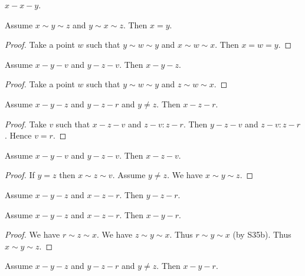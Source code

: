 \documentclass{article}
\newcommand{\Betw}[3]{#1 {\sim} #2 {\sim} #3}
\begin{document}
  \begin{forthel}
    \begin{lemma}[L3o3]
      $x-x-y$.
    \end{lemma}

    \begin{lemma} %
      Assume $\Betw{x}{y}{z}$ and $\Betw{y}{x}{z}$.
      Then $x = y$.
    \end{lemma}
    \begin{proof}
      Take a point $w$ such that
      $\Betw{y}{w}{y}$ and $\Betw{x}{w}{x}$.
      Then $x = w = y$.
    \end{proof}

    \begin{lemma} %
      Assume $x-y-v$ and $y-z-v$. Then $x-y-z$.
    \end{lemma}
    \begin{proof}
      Take a point $w$ such that
      $\Betw{y}{w}{y}$ and $\Betw{z}{w}{x}$.
    \end{proof}

    \begin{lemma}[L3o7a]
      Assume $x-y-z$ and $y-z-r$ and $y \neq z$. Then $x-z-r$.
    \end{lemma}
    \begin{proof}
    	Take $v$ such that $x-z-v$ and $z-v : z-r$.	Then $y-z-v$ and $z-v : z-r$. Hence $v = r$.
    \end{proof}

    \begin{lemma}[S35b] %
      Assume $x-y-v$ and $y-z-v$. Then $x-z-v$.
    \end{lemma}
    \begin{proof}
      If $y = z$ then $\Betw{x}{z}{v}$.
      Assume $y \neq z$.
      We have $\Betw{x}{y}{z}$.
    \end{proof}

    \begin{lemma}[L3o6a]
      Assume $x-y-z$ and $x-z-r$. Then $y-z-r$.
    \end{lemma}

    \begin{lemma} %
      Assume $x-y-z$ and $x-z-r$. Then $x-y-r$.
    \end{lemma}
    \begin{proof}
      We have $\Betw{r}{z}{x}$.
      We have $\Betw{z}{y}{x}$.
      Thus $\Betw{r}{y}{x}$ (by S35b).
      Thus $\Betw{x}{y}{z}$.
    \end{proof}



    \begin{lemma}[L3o7b]
      Assume $x-y-z$ and $y-z-r$ and $y \neq z$. Then $x-y-r$.
    \end{lemma}
  \end{forthel}
\end{document}
